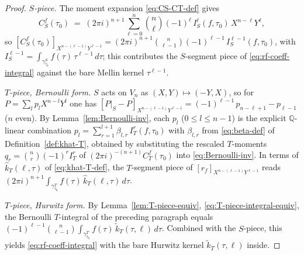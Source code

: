 \documentclass[11pt]{article}
\numberwithin{equation}{section}  %
\newcommand{\QQ}{\mathbb{Q}}
\begin{document}
\begin{proof}
\emph{$S$-piece.}  The moment expansion \eqref{eq:CS-CT-def} gives
\begin{equation}
  C^f_S(\tau_0)
  \;=\; (2\pi i)^{n + 1}\!\sum_{\ell = 0}^{n}\!\binom{n}{\ell}(-1)^\ell\,
  I_S^\ell(f, \tau_0)\,X^{n - \ell} Y^\ell,
\end{equation}
so $[C^f_S(\tau_0)]_{X^{n - (\ell - 1)} Y^{\ell - 1}} = (2\pi i)^{n + 1}
\binom{n}{\ell - 1}(-1)^{\ell - 1}\,I_S^{\ell - 1}(f, \tau_0)$, with
$I_S^{\ell - 1} = \int_{\gamma^S_{\tau_0}} f(\tau)\,\tau^{\ell - 1}\,d\tau$;
this contributes the $S$-segment piece of \eqref{eq:rf-coeff-integral}
against the bare Mellin kernel $\tau^{\ell - 1}$.

\emph{$T$-piece, Bernoulli form.}  $S$ acts on $V_n$ as
$(X, Y) \mapsto (-Y, X)$, so for $P = \sum_l p_l X^{n - l} Y^l$ one has
$[P|_S - P]_{X^{n - (\ell - 1)} Y^{\ell - 1}} = (-1)^{\ell - 1}\,p_{n - \ell + 1}
- p_{\ell - 1}$ ($n$ even).  By Lemma~\ref{lem:Bernoulli-inv}, each
$p_l$ ($0 \le l \le n - 1$) is the explicit $\QQ$-linear combination
$p_l = \sum_{r = 1}^{l + 1} \beta_{l, r}\,I_T^r(f, \tau_0)$
with $\beta_{l, r}$ from \eqref{eq:beta-def} of
Definition~\ref{def:khat-T}, obtained by substituting the rescaled
$T$-moments $q_r = \binom{n}{r}(-1)^r I_T^r$ of
$(2\pi i)^{-(n + 1)} C^f_T(\tau_0)$ into \eqref{eq:Bernoulli-inv}.  In
terms of $\widehat{k}_T(\ell, \tau)$ of \eqref{eq:khat-T-def}, the
$T$-segment piece of $[r_f]_{X^{n - (\ell - 1)} Y^{\ell - 1}}$ reads
$(2\pi i)^{n + 1}\!\int_{\gamma^T_{\tau_0}}\! f(\tau)\,\widehat{k}_T(\ell, \tau)\,d\tau$.

\emph{$T$-piece, Hurwitz form.}  By Lemma~\ref{lem:T-piece-equiv},
\eqref{eq:T-piece-integral-equiv}, the Bernoulli $T$-integral of the
preceding paragraph equals
$(-1)^{\ell - 1}\binom{n}{\ell - 1}\!\int_{\gamma^T_{\tau_0}}\! f(\tau)\,\widetilde{k}_T(\tau, \ell)\,d\tau$.
Combined with the $S$-piece, this yields \eqref{eq:rf-coeff-integral}
with the bare Hurwitz kernel $\widetilde{k}_T(\tau, \ell)$ inside.
\end{proof}
\end{document}
